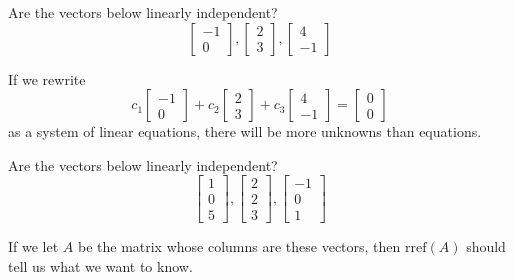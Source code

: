 \documentclass{ximera}
\begin{document}
 \begin{problem}\label{prob:linindmultchoice1}
 Are the vectors below linearly independent?
$$\begin{bmatrix}-1\\0\end{bmatrix}, \begin{bmatrix}2\\3\end{bmatrix},\begin{bmatrix}4\\-1\end{bmatrix}$$

\begin{multipleChoice}
 \end{multipleChoice}
 \begin{hint}
 If we rewrite $$c_1\begin{bmatrix}-1\\0\end{bmatrix}+c_2 \begin{bmatrix}2\\3\end{bmatrix}+c_3\begin{bmatrix}4\\-1\end{bmatrix}=\begin{bmatrix}0\\0\end{bmatrix}$$ as a system of linear equations, there will be more unknowns than equations.
 \end{hint}
\end{problem}

\begin{problem}\label{prob:linindmultchoice2}
 Are the vectors below linearly independent?
$$\begin{bmatrix}1\\0\\5\end{bmatrix}, \begin{bmatrix}2\\2\\3\end{bmatrix},\begin{bmatrix}-1\\0\\1\end{bmatrix}$$

\begin{multipleChoice}
 \end{multipleChoice}
\begin{hint}
If we let $A$ be the matrix whose columns are these vectors, then $\mbox{rref}(A)$ should tell us what we want to know.
\end{hint}
\end{problem}
\end{document}
